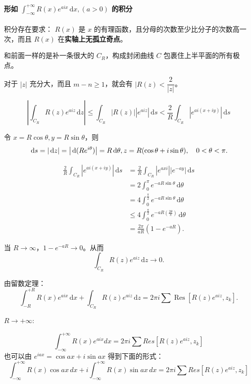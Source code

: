 \paragraph{形如 \(\int_{-\infty}^{+\infty}R(x)e^{aix}\,\mathrm{d}x,(a>0)\) 的积分}
\label{形如-int_-inftyinftyrxeaixmathrmdxa0-的积分}
积分存在要求： \(R(x)\) 是 \(x\)
的有理函数，且分母的次数至少比分子的次数高一次，而且 \(R(x)\)
在\textbf{实轴上无孤立奇点}。

和前面一样的是补一条很大的 \(C_R\)，构成封闭曲线 \(C\)
包裹住上半平面的所有极点。

对于 \(|z|\) 充分大，而且 \(m-n \ge 1\)，就会有
\(|R(z) < \dfrac{2}{|z|}\)。

\[
\left| \int _{C_R} R(z)e^{aiz}\,\mathrm{d}z \right| \le \int _{C_R} |R(z)| \left|e^{aiz}\right| \,\mathrm{d}s < \frac{2}{R} \int _{C_R} \left|e^{ai(x+iy)}\right| \,\mathrm{d}s
\]

令 \(x=R\cos \theta,y=R\sin\theta\)，则
\[
\,\mathrm{d}s=|\,\mathrm{d}z|=\left|\,\mathrm{d}(Re^{i\theta})\right|=R\,\mathrm{d}\theta,\\
z=R(\cos\theta+i\sin\theta),\quad 0 < \theta < \pi.\\
\]

\begin{align*}
    \frac{2}{R} \int _{C_R} \left| e^{ai(x+iy)} \right| \,\mathrm{d}s
    &= \frac{2}{R} \int _{C_R} \left| e^{axi} \right|  \left| e^{-ay} \right| \,\mathrm{d}s
    \\
    &= 2 \int _{0}^{\pi} e^{-aR\sin\theta} \,\mathrm{d}\theta
    \\
    &= 4 \int _{0}^{\frac{\pi}{2}} e^{-aR\sin\theta}  \,\mathrm{d}\theta
    \\
    &\le 4 \int _{0}^{\frac{\pi}{2}} e^{-aR(\frac{2\theta}{\pi})} \,\mathrm{d}\theta
    \\
    &= \frac{2 \pi}{aR} (1-e^{-aR}).
\end{align*}

当 \(R \to \infty\)，\(1-e^{-aR} \to 0\)。从而
\[
\int_{C_R} R(z)e^{aiz} \,\mathrm{d}z \to 0.
\]

由留数定理：
\[
\int_{-R}^{+R}R(x)e^{aix}\,\mathrm{d}x + \int_{C_R} R(z)e^{aiz} \,\mathrm{d}z = 2 \pi i \sum \operatorname{Res}[R(z)e^{aiz},z_k].
\]

\(R\rightarrow +\infty:\)

\[
\int_{-\infty}^{+\infty}R(x)e^{aix}dx = 2\pi i\sum Res[R(z)e^{aiz},z_k] \]
也可以由 \(\boxed{e^{iax}=\cos ax + i\sin ax}\) 得到下面的形式： \[
\int_{-\infty}^{+\infty}R(x)\cos ax\,dx + i\int_{-\infty}^{+\infty}R(x)\sin ax\,dx = 2\pi i\sum Res[R(z)e^{aiz},z_k]
\]
